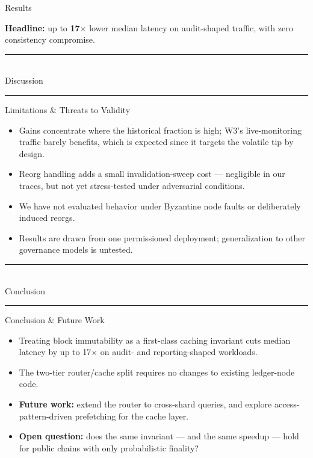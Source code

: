 \documentclass[pdf]{prosper}
\newcommand{\Divider}[1]{%
\begin{slide}{}
\vspace{2.2cm}
\begin{center}
{\color{softgray}\rule{6cm}{0.4pt}}\\[0.5cm]
{\usefont{T1}{phv}{b}{n}\selectfont\color{deepnavy}\Huge #1}\\[0.4cm]
{\color{softgray}\rule{6cm}{0.4pt}}
\end{center}
\end{slide}%
}
\begin{document}
\begin{slide}{Results}
\begin{center}
\renewcommand{\arraystretch}{1.25}
%
\end{center}
\vspace{0.4cm}
\begin{tcolorbox}[colback=paperwhite,colframe=amber,boxrule=0.8pt,arc=2pt,left=8pt,right=8pt,top=6pt,bottom=6pt]
\textbf{\textcolor{deepnavy}{Headline:}} up to \textbf{17$\times$} lower median latency on audit-shaped traffic, with zero consistency compromise.
\end{tcolorbox}
\end{slide}

\Divider{Discussion}

\begin{slide}{Limitations \& Threats to Validity}
\begin{itemize}
\item Gains concentrate where the historical fraction is high; W3's live-monitoring traffic barely benefits, which is expected since it targets the volatile tip by design.
\item Reorg handling adds a small invalidation-sweep cost --- negligible in our traces, but not yet stress-tested under adversarial conditions.
\item We have not evaluated behavior under Byzantine node faults or deliberately induced reorgs.
\item Results are drawn from one permissioned deployment; generalization to other governance models is untested.
\end{itemize}
\end{slide}

\Divider{Conclusion}

\begin{slide}{Conclusion \& Future Work}
\begin{itemize}
\item Treating block immutability as a first-class caching invariant cuts median latency by up to 17$\times$ on audit- and reporting-shaped workloads.
\item The two-tier router/cache split requires no changes to existing ledger-node code.
\item \textbf{Future work:} extend the router to cross-shard queries, and explore access-pattern-driven prefetching for the cache layer.
\item \textbf{Open question:} does the same invariant --- and the same speedup --- hold for public chains with only probabilistic finality?
\end{itemize}
\end{slide}
\end{document}
